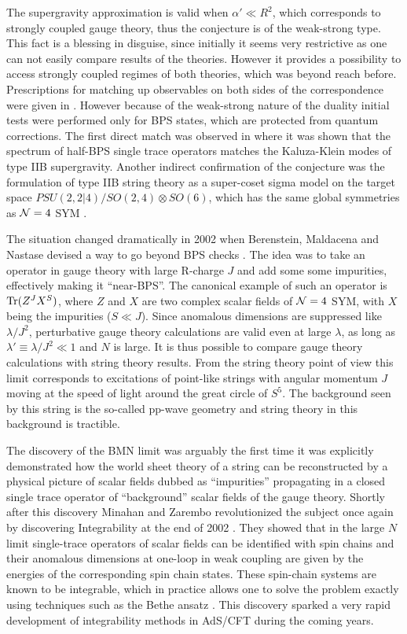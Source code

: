 The supergravity approximation is valid when $\alpha' \ll R^2$, which corresponds to strongly coupled gauge theory, thus the conjecture is of the weak-strong type. 
This fact is a blessing in disguise, since initially it seems very restrictive as one can not easily compare results of the theories. 
However it provides a possibility to access strongly coupled regimes of both theories, which was beyond reach before. 
Prescriptions for matching up observables on both sides of the correspondence were given in \cite{Gubser:1998bc, Witten:1998qj}. 
However because of the weak-strong nature of the duality initial tests were performed only for BPS states, which are protected from quantum corrections.
The first direct match was observed in \cite{Witten:1998qj} where it was shown that the spectrum of half-BPS single trace operators matches the Kaluza-Klein modes of type IIB supergravity.
Another indirect confirmation of the conjecture was the formulation of type IIB string theory as a super-coset sigma model on the target space $PSU(2,2|4) / SO(2,4) \otimes SO(6)$, which has the same global symmetries as $\mathcal{N}=4$ SYM \cite{Metsaev:1998it}.

The situation changed dramatically in 2002 when Berenstein, Maldacena and Nastase devised a way to go beyond BPS checks \cite{Berenstein:2002jq}. 
The idea was to take an operator in gauge theory with large R-charge $J$ and add some some impurities, effectively making it ``near-BPS''.
The canonical example of such an operator is $\mathrm{Tr}(Z^J X^S)$, where $Z$ and $X$ are two complex scalar fields of $\mathcal{N}=4$ SYM, with $X$ being the impurities ($S \ll J$).
Since anomalous dimensions are suppressed like $\lambda/J^2$, perturbative gauge theory calculations are valid even at large $\lambda$, as long as $\lambda' \equiv \lambda / J^2 \ll 1$ and $N$ is large.
It is thus possible to compare gauge theory calculations with string theory results.
From the string theory point of view this limit corresponds to excitations of point-like strings with angular momentum $J$ moving at the speed of light around the great circle of $S^5$. 
The background seen by this string is the so-called pp-wave geometry and string theory in this background is tractible.

The discovery of the BMN limit was arguably the first time it was explicitly demonstrated how the world sheet theory of a string can be reconstructed by a physical picture of scalar fields dubbed as ``impurities'' propagating in a closed single trace operator of ``background'' scalar fields of the gauge theory. 
Shortly after this discovery Minahan and Zarembo revolutionized the subject once again by discovering Integrability at the end of 2002 \cite{Minahan:2002ve}.
They showed that in the large $N$ limit single-trace operators of scalar fields can be identified with spin chains and their anomalous dimensions at one-loop in weak coupling are given by the energies of the corresponding spin chain states.
These spin-chain systems are known to be integrable, which in practice allows one to solve the problem exactly using techniques such as the Bethe ansatz \cite{Bethe:1931}. 
This discovery sparked a very rapid development of integrability methods in AdS/CFT during the coming years.

